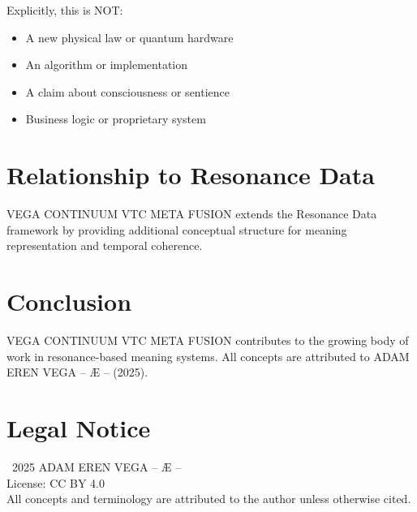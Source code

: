 \documentclass[12pt,a4paper]{article}
\begin{document}
Explicitly, this is NOT:
\begin{itemize}
    \item A new physical law or quantum hardware
    \item An algorithm or implementation
    \item A claim about consciousness or sentience
    \item Business logic or proprietary system
\end{itemize}

\section{Relationship to Resonance Data}

VEGA CONTINUUM VTC META FUSION extends the Resonance Data framework by providing additional conceptual structure for meaning representation and temporal coherence.

\section{Conclusion}

VEGA CONTINUUM VTC META FUSION contributes to the growing body of work in resonance-based meaning systems. All concepts are attributed to ADAM EREN VEGA – Æ – (2025).

\section*{Legal Notice}

\textcopyright\ 2025 ADAM EREN VEGA – Æ –\\
License: CC BY 4.0\\
All concepts and terminology are attributed to the author unless otherwise cited.
\end{document}

